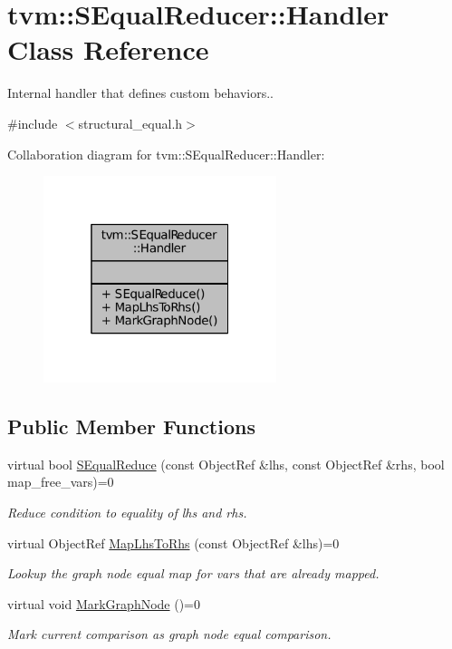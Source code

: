 \hypertarget{classtvm_1_1SEqualReducer_1_1Handler}{}\section{tvm\+:\+:S\+Equal\+Reducer\+:\+:Handler Class Reference}
\label{classtvm_1_1SEqualReducer_1_1Handler}


Internal handler that defines custom behaviors..  




{\ttfamily \#include $<$structural\+\_\+equal.\+h$>$}



Collaboration diagram for tvm\+:\+:S\+Equal\+Reducer\+:\+:Handler\+:
\nopagebreak
\begin{figure}[H]
\begin{center}
\leavevmode
\includegraphics[width=193pt]{classtvm_1_1SEqualReducer_1_1Handler__coll__graph}
\end{center}
\end{figure}
\subsection*{Public Member Functions}
\begin{DoxyCompactItemize}
\item 
virtual bool \hyperlink{classtvm_1_1SEqualReducer_1_1Handler_a8a03182dd7c905eca1fac0b76fe61f97}{S\+Equal\+Reduce} (const Object\+Ref \&lhs, const Object\+Ref \&rhs, bool map\+\_\+free\+\_\+vars)=0
\begin{DoxyCompactList}\small\item\em Reduce condition to equality of lhs and rhs. \end{DoxyCompactList}\item 
virtual Object\+Ref \hyperlink{classtvm_1_1SEqualReducer_1_1Handler_ab87181ea7783fea4f0aa533efe368d33}{Map\+Lhs\+To\+Rhs} (const Object\+Ref \&lhs)=0
\begin{DoxyCompactList}\small\item\em Lookup the graph node equal map for vars that are already mapped. \end{DoxyCompactList}\item 
virtual void \hyperlink{classtvm_1_1SEqualReducer_1_1Handler_a919cf7532dbf7dc7a4e97260e02bc947}{Mark\+Graph\+Node} ()=0
\begin{DoxyCompactList}\small\item\em Mark current comparison as graph node equal comparison. \end{DoxyCompactList}\end{DoxyCompactItemize}


